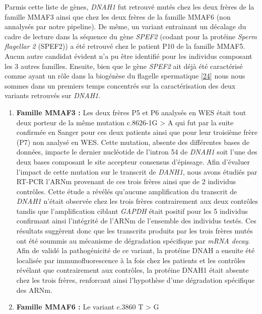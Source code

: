 \documentclass[12pt,twoside]{reedthesis}
\theoremstyle{definition}
\theoremstyle{definition}
\theoremstyle{remark}
\begin{document}
  Parmis cette liste de gènes, \emph{DNAH1} fut retrouvé mutés chez les
  deux frères de la famille MMAF3 ainsi que chez les deux frères de la
  famille MMAF6 (non annalysés par notre pipeline). De même, un variant
  entrainant un décalage du cadre de lecture dans la séquence du gène
  \emph{SPEF2} (codant pour la protéine \emph{Sperm flagellar 2} (SPEF2))
  a été retrouvé chez le patient P10 de la famille MMAF5. Aucun autre
  candidat évident n'a pu être identifié pour les individus composant les
  3 autres familles. Ensuite, bien que le gène \emph{SPEF2} ait déjà été
  caractérisé comme ayant un rôle dans la biogénèse du flagelle
  spermatique {[}\protect\hyperlink{ref-Lehti2017}{24}{]} nous nous sommes
  dans un premiers temps concentrés sur la caractérisation des deux
  variants retrouvés sur \emph{DNAH1}.
  
  \begin{enumerate}
  \def\labelenumi{\arabic{enumi}.}
  \item
    \textbf{Famille MMAF3 :} Les deux frères P5 et P6 analysés en WES
    était tout deux porteur de la même mutation c.8626-1G \textgreater{} A
    qui fut par la suite confirmée en Sanger pour ces deux patients ainsi
    que pour leur troisième frère (P7) non analysé en WES. Cette mutation,
    absente des différentes bases de données, impacte le dernier
    nucléotide de l'intron 54 de \emph{DNAH1} soit l'une des deux bases
    composant le site accepteur consensus d'épissage. Afin d'évaluer
    l'impact de cette mutation sur le transcrit de \emph{DANH1}, nous
    avons étudiés par RT-PCR l'ARNm provenant de ces trois frères ainsi
    que de 2 individus contrôles. Cette étude a révélés qu'aucune
    amplification du transcrit de \emph{DNAH1} n'était observée chez les
    trois frères contrairement aux deux contrôles tandis que
    l'amplification ciblant \emph{GAPDH} était positif pour les 5
    individus confirmant ainsi l'intégrité de l'ARNm de l'ensemble des
    individus testés. Ces résultats suggèrent donc que les transcrits
    produits par les trois frères mutés ont été soummis au mécanisme de
    dégradation spécifique par \emph{mRNA decay}. Afin de validé la
    pathogénicité de ce variant, la protéine DNAH a ensuite été localisée
    par immunofluorescence à la fois chez les patients et les contrôles
    révélant que contrairement aux contrôles, la protéine DNAH1 était
    absente chez les trois frères, renforcant ainsi l'hypothèse d'une
    dégradation spécifique des ARNm.
  \item
    \textbf{Famille MMAF6 :} Le variant c.3860 T \textgreater{} G

\end{enumerate}
\end{document}
